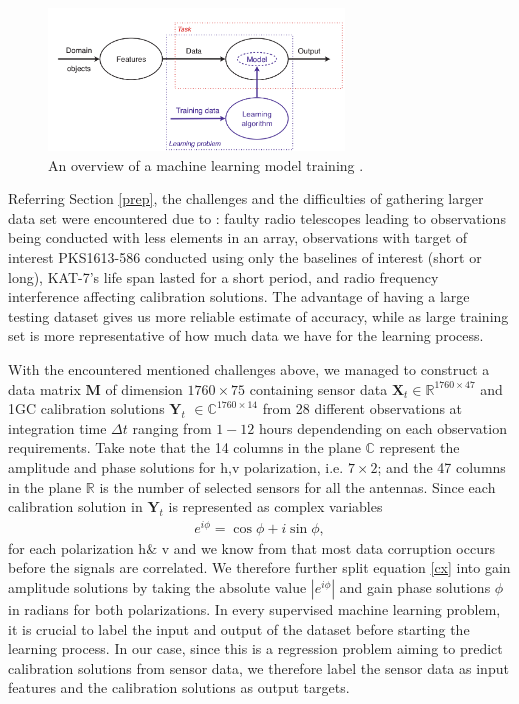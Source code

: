 \begin{figure}[H]
  \centering
    \includegraphics[width=0.7\textwidth]{images/MLSampler.png}
    \caption{An overview of a machine learning model training \citep{flach2012machine}.}
  \label{overview}
\end{figure}

Referring Section \ref{prep}, the challenges and the difficulties of gathering  larger data set were encountered  due to : faulty radio telescopes leading to observations being conducted with less elements in an array, observations with target of interest PKS1613-586 conducted using only the baselines of interest (short or long), KAT-7's life span lasted for a short period, and radio frequency interference affecting calibration solutions. The advantage of having a large testing dataset gives us more reliable estimate of accuracy, while as large training set is more representative of how much data we have for the learning process. 

With the encountered mentioned challenges above, we managed to construct a data matrix $\textbf{M}$ of dimension  $1760\times 75$ containing sensor data $\textbf{X}_t\in \mathbb{R}^{1760 \times 47}$ and 1GC calibration solutions $\textbf{Y}_t$ $\in \mathbb{C}^{1760 \times 14}$ from 28 different observations at integration time $\Delta t$ ranging from $1-12$ hours dependending on each observation requirements. Take note that the 14 columns in the plane $\mathbb{C}$ represent the amplitude and phase solutions for h,v polarization, i.e. $7 \times 2$; and the 47 columns in the plane $\mathbb{R}$ is the number of selected sensors for all the antennas. Since each calibration solution in $\textbf{Y}_t$ is represented as complex variables \begin{align}
e^{i\phi}= \cos\phi + i\sin\phi, \label{cx}
\end{align} for each polarization h$\&$ v and we know from \citep{taylor1999synthesis} that most data corruption occurs before the signals are correlated. We therefore further split equation \ref{cx} into gain amplitude solutions by taking the absolute value  $\left|e^{i\phi}\right|$ and gain phase solutions $\phi$ in radians for both polarizations. In every supervised machine learning problem, it is crucial to label the input and output of the dataset before starting the learning process. In our case, since this is a regression problem aiming to predict calibration solutions from sensor data, we therefore label the sensor data as input features and the calibration solutions as output targets.
    
